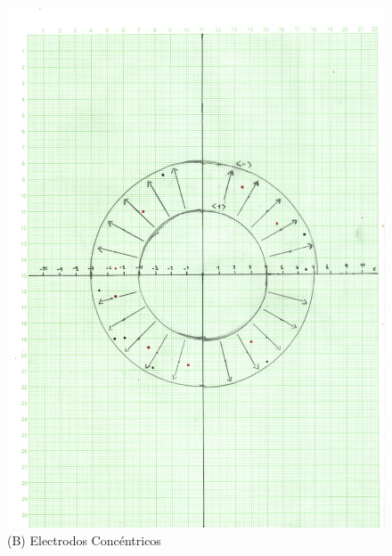 \documentclass[letterpaper, 12pt]{report}
\begin{document}
\begin{figure}[H]
	\begin{center}
		\includegraphics[scale = 0.75]{./Images/Concenctricos.jpg}
		\caption{(B) Electrodos Concéntricos}
	\end{center}
\end{figure}
\end{document}
